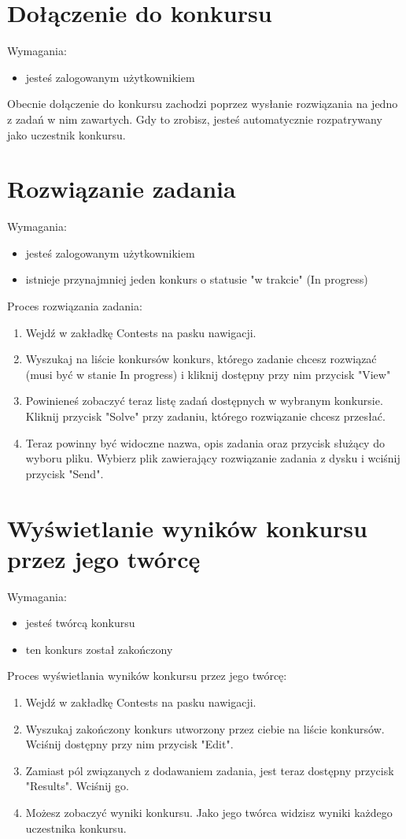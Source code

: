 \documentclass{article}
\begin{document}
\section{Dołączenie do konkursu}
Wymagania:
\begin{itemize}
	\item jesteś zalogowanym użytkownikiem
\end{itemize}
Obecnie dołączenie do konkursu zachodzi poprzez wysłanie rozwiązania na jedno z zadań w nim zawartych. Gdy to zrobisz, jesteś automatycznie rozpatrywany jako uczestnik konkursu.

\section{Rozwiązanie zadania}
Wymagania:
\begin{itemize}
	\item jesteś zalogowanym użytkownikiem
	\item istnieje przynajmniej jeden konkurs o statusie "w trakcie" (In progress)
\end{itemize}
Proces rozwiązania zadania:
\begin{enumerate}
	\item Wejdź w zakładkę Contests na pasku nawigacji.
	\item Wyszukaj na liście konkursów konkurs, którego zadanie chcesz rozwiązać (musi być w stanie In progress) i kliknij dostępny przy nim przycisk "View"
	\item Powinieneś zobaczyć teraz listę zadań dostępnych w wybranym konkursie. Kliknij przycisk "Solve" przy zadaniu, którego rozwiązanie chcesz przesłać.
	\item Teraz powinny być widoczne nazwa, opis zadania oraz przycisk służący do wyboru pliku. Wybierz plik zawierający rozwiązanie zadania z dysku i wciśnij przycisk "Send".
\end{enumerate}

\section{Wyświetlanie wyników konkursu przez jego twórcę}
Wymagania:
\begin{itemize}
	\item jesteś twórcą konkursu
	\item ten konkurs został zakończony
\end{itemize}
Proces wyświetlania wyników konkursu przez jego twórcę:
\begin{enumerate}
	\item Wejdź w zakładkę Contests na pasku nawigacji.
	\item Wyszukaj zakończony konkurs utworzony przez ciebie na liście konkursów. Wciśnij dostępny przy nim przycisk "Edit".
	\item Zamiast pól związanych z dodawaniem zadania, jest teraz dostępny przycisk "Results". Wciśnij go.
	\item Możesz zobaczyć wyniki konkursu. Jako jego twórca widzisz wyniki każdego uczestnika konkursu.
\end{enumerate}
\end{document}
